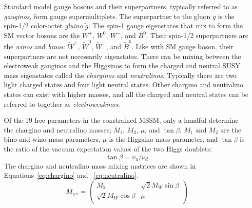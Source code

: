Standard model gauge bosons and their superpartners, typically referred to as \textit{gauginos}, form gauge supermultiplets.  The superpartner to the gluon $g$ is the spin-1/2 color-octet \textit{gluino} $\tilde{g}$.  The spin-1 gauge eigenstates that mix to form the SM vector bosons are the $W^+$, $W^0$, $W^-$, and $B^0$.  Their spin-1/2 superpartners are the \textit{winos} and \textit{binos}: $\tilde{W}^+$, $\tilde{W}^0$, $\tilde{W}^-$, and $\tilde{B}^0$.  Like with SM gauge boson, their superpartners are not necessarily eigenstates.  There can be mixing between the electroweak gauginos and the Higgsinos to form the charged and neutral SUSY mass eigenstates called the \textit{charginos} and \textit{neutralinos}.  Typically there are two light charged states and four light neutral states.  Other chargino and neutralino states can exist with higher masses, and all the charged and neutral states can be referred to together as \textit{electroweakinos}.

Of the 19 free parameters in the constrained MSSM, only a handful determine the chargino and neutralino masses; $M_1$, $M_2$, $\mu$, and $\tan\beta$.  $M_1$ and $M_2$ are the bino and wino mass parameters, $\mu$ is the Higgsino mass parameter, and $\tan\beta$ is the ratio of the vacuum expectation values of the two Higgs doublets:
\begin{equation}
\tan\beta=\nu_u/\nu_d
\end{equation}
The chargino and neutralino mass mixing matrices are shown in Equations~\ref{eq:chargino} and ~\ref{eq:neutralino}.
\begin{equation}
M_{\chi^\pm}=
\begin{pmatrix}
M_2 & \sqrt{2}M_W\sin\beta \\
\sqrt{2}M_W\cos\beta & \mu \\
\end{pmatrix}
\label{eq:chargino}
\end{equation}

